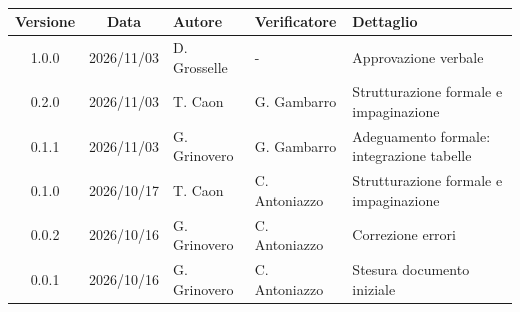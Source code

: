 \\[0.5cm]

\renewcommand{\arraystretch}{1.3}
\noindent
\begin{tabularx}{\textwidth}{|c|c|>{\raggedright\arraybackslash}p{2.5cm}|>{\raggedright\arraybackslash}p{2.5cm}|X|}
    \hline
    \textbf{Versione} & \textbf{Data} & \textbf{Autore} & \textbf{Verificatore} & \textbf{Dettaglio} \\
    \hline
    1.0.0 & 2026/11/03 & D. Grosselle & - & Approvazione verbale \\
    \hline
    0.2.0 & 2026/11/03 & T. Caon & G. Gambarro & Strutturazione formale e impaginazione \\
    \hline
    0.1.1 & 2026/11/03 & G. Grinovero & G. Gambarro & Adeguamento formale: integrazione tabelle \\
    \hline
    0.1.0 & 2026/10/17 & T. Caon & C. Antoniazzo & Strutturazione formale e impaginazione \\
    \hline
    0.0.2 & 2026/10/16 & G. Grinovero & C. Antoniazzo & Correzione errori \\
    \hline
    0.0.1 & 2026/10/16 & G. Grinovero & C. Antoniazzo & Stesura documento iniziale \\
    \hline
\end{tabularx}
\newpage

